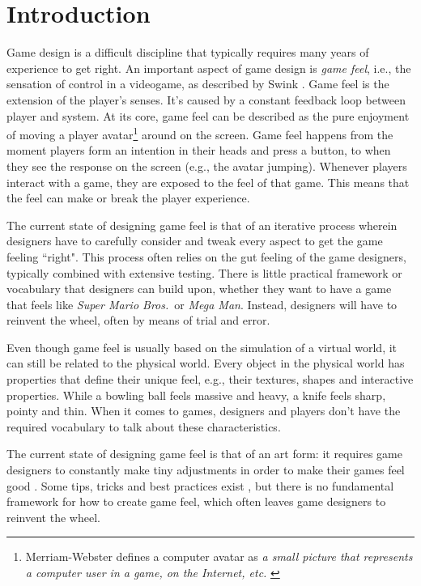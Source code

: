 \section{Introduction}
Game design is a difficult discipline that typically requires many years of experience to get right. An important aspect of game design is \textit{game feel}, i.e., the sensation of control in a videogame, as described by Swink \cite{swink}. Game feel is the extension of the player's senses. It's caused by a constant feedback loop between player and system. At its core, game feel can be described as the pure enjoyment of moving a player avatar\footnote{Merriam-Webster defines a computer avatar as \textit{a small picture that represents a computer user in a game, on the Internet, etc.} \cite{avatar}} around on the screen. Game feel happens from the moment players form an intention in their heads and press a button, to when they see the response on the screen (e.g., the avatar jumping). Whenever players interact with a game, they are exposed to the feel of that game. This means that the feel can make or break the player experience.

The current state of designing game feel is that of an iterative process wherein designers have to carefully consider and tweak every aspect to get the game feeling ``right". This process often relies on the gut feeling of the game designers, typically combined with extensive testing. There is little practical framework or vocabulary that designers can build upon, whether they want to have a game that feels like \textit{Super Mario Bros.}\ or \textit{Mega Man}. Instead, designers will have to reinvent the wheel, often by means of trial and error.

Even though game feel is usually based on the simulation of a virtual world, it can still be related to the physical world. Every object in the physical world has properties that define their unique feel, e.g., their textures, shapes and interactive properties. While a bowling ball feels massive and heavy, a knife feels sharp, pointy and thin. When it comes to games, designers and players don't have the required vocabulary to talk about these characteristics.

The current state of designing game feel is that of an art form: it requires game designers to constantly make tiny adjustments in order to make their games feel good \cite{meatboy1, meatboy2, juicyBeast}. Some tips, tricks and best practices exist \cite{platformer_controls, gameFeelTips}, but there is no fundamental framework for how to create game feel, which often leaves game designers to reinvent the wheel.

